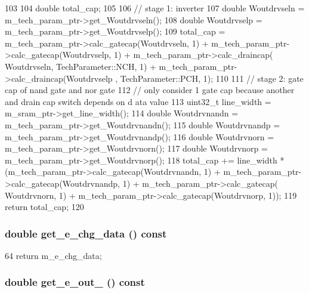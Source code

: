 \begin{DoxyCode}
103 {
104     double total_cap;
105 
106     // stage 1: inverter
107     double Woutdrvseln = m_tech_param_ptr->get_Woutdrvseln();
108     double Woutdrvselp = m_tech_param_ptr->get_Woutdrvselp();
109     total_cap = m_tech_param_ptr->calc_gatecap(Woutdrvseln, 1) + 
      m_tech_param_ptr->calc_gatecap(Woutdrvselp, 1) + m_tech_param_ptr->calc_draincap(
      Woutdrvseln, TechParameter::NCH, 1) + m_tech_param_ptr->calc_draincap(Woutdrvselp
      , TechParameter::PCH, 1);
110 
111     // stage 2: gate cap of nand gate and nor gate
112     // only consider 1 gate cap because another and drain cap switch depends on d
      ata value
113     uint32_t line_width = m_sram_ptr->get_line_width();
114     double Woutdrvnandn = m_tech_param_ptr->get_Woutdrvnandn();
115     double Woutdrvnandp = m_tech_param_ptr->get_Woutdrvnandp();
116     double Woutdrvnorn = m_tech_param_ptr->get_Woutdrvnorn();
117     double Woutdrvnorp = m_tech_param_ptr->get_Woutdrvnorp();
118     total_cap += line_width * (m_tech_param_ptr->calc_gatecap(Woutdrvnandn, 1) + 
      m_tech_param_ptr->calc_gatecap(Woutdrvnandp, 1) + m_tech_param_ptr->calc_gatecap(
      Woutdrvnorn, 1) + m_tech_param_ptr->calc_gatecap(Woutdrvnorp, 1));
119     return total_cap;
120 }
\end{DoxyCode}
\hypertarget{classOutdrvUnit_a52d13d5ef1f05b0b97859485ffc0fb6a}{
\subsubsection[{get\_\-e\_\-chg\_\-data}]{\setlength{\rightskip}{0pt plus 5cm}double get\_\-e\_\-chg\_\-data () const}}
\label{classOutdrvUnit_a52d13d5ef1f05b0b97859485ffc0fb6a}



\begin{DoxyCode}
64 { return m_e_chg_data; }
\end{DoxyCode}
\hypertarget{classOutdrvUnit_ad0ed85e6312b8342e2481cd8170e890d}{
\subsubsection[{get\_\-e\_\-out\_\-0}]{\setlength{\rightskip}{0pt plus 5cm}double get\_\-e\_\-out\_ () const}}
\label{classOutdrvUnit_ad0ed85e6312b8342e2481cd8170e890d}



